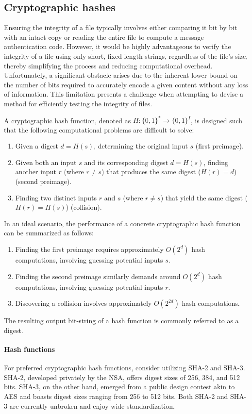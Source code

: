 \subsection{Cryptographic hashes}
Ensuring the integrity of a file typically involves either comparing it bit by bit with an intact copy or reading the entire file to compute a message authentication code.
However, it would be highly advantageous to verify the integrity of a file using only short, fixed-length strings, regardless of the file's size, thereby simplifying the process and reducing computational overhead.
Unfortunately, a significant obstacle arises due to the inherent lower bound on the number of bits required to accurately encode a given content without any loss of information. 
This limitation presents a challenge when attempting to devise a method for efficiently testing the integrity of files.

A cryptographic hash function, denoted as $H : \{0, 1\}^\ast \rightarrow \{0, 1\}^I$, is designed such that the following computational problems are difficult to solve:
\begin{enumerate}
    \item Given a digest $d = H(s)$, determining the original input $s$ (first preimage).
    \item Given both an input $s$ and its corresponding digest $d = H(s)$, finding another input $r$ (where $r \neq s$) that produces the same digest ($H(r) = d$) (second preimage).
    \item Finding two distinct inputs $r$ and $s$ (where $r \neq s$) that yield the same digest ($H(r) = H(s)$) (collision).
\end{enumerate}
In an ideal scenario, the performance of a concrete cryptographic hash function can be summarized as follows:
\begin{enumerate}
    \item Finding the first preimage requires approximately $O(2^d)$ hash computations, involving guessing potential inputs $s$.
    \item Finding the second preimage similarly demands around $O(2^d)$ hash computations, involving guessing potential inputs $r$.
    \item Discovering a collision involves approximately $O(2^{2d})$ hash computations.
\end{enumerate}
The resulting output bit-string of a hash function is commonly referred to as a digest.

\paragraph*{Hash functions}
For preferred cryptographic hash functions, consider utilizing SHA-2 and SHA-3. 
SHA-2, developed privately by the NSA, offers digest sizes of 256, 384, and 512 bits. 
SHA-3, on the other hand, emerged from a public design contest akin to AES and boasts digest sizes ranging from 256 to 512 bits. 
Both SHA-2 and SHA-3 are currently unbroken and enjoy wide standardization.

